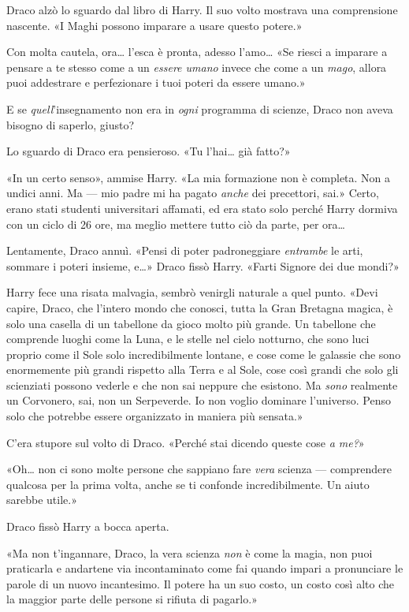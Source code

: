 Draco alzò lo sguardo dal libro di Harry. Il suo volto mostrava una comprensione nascente. «I Maghi possono imparare a usare questo potere.»

Con molta cautela, ora… l’esca è pronta, adesso l’amo… «Se riesci a imparare a pensare a te stesso come a un \textit{essere umano} invece che come a un \textit{mago}, allora puoi addestrare e perfezionare i tuoi poteri da essere umano.»

E se \textit{quell}’insegnamento non era in \textit{ogni} programma di scienze, Draco non aveva bisogno di saperlo, giusto?

Lo sguardo di Draco era pensieroso. «Tu l’hai… già fatto?»

«In un certo senso», ammise Harry. «La mia formazione non è completa. Non a undici anni. Ma — mio padre mi ha pagato \textit{anche} dei precettori, sai.» Certo, erano stati studenti universitari affamati, ed era stato solo perché Harry dormiva con un ciclo di 26 ore, ma meglio mettere tutto ciò da parte, per ora…

Lentamente, Draco annuì. «Pensi di poter padroneggiare \textit{entrambe} le arti, sommare i poteri insieme, e…» Draco fissò Harry. «Farti Signore dei due mondi?»

Harry fece una risata malvagia, sembrò venirgli naturale a quel punto. «Devi capire, Draco, che l’intero mondo che conosci, tutta la Gran Bretagna magica, è solo una casella di un tabellone da gioco molto più grande. Un tabellone che comprende luoghi come la Luna, e le stelle nel cielo notturno, che sono luci proprio come il Sole solo incredibilmente lontane, e cose come le galassie che sono enormemente più grandi rispetto alla Terra e al Sole, cose così grandi che solo gli scienziati possono vederle e che non sai neppure che esistono. Ma \textit{sono} realmente un Corvonero, sai, non un Serpeverde. Io non voglio dominare l’universo. Penso solo che potrebbe essere organizzato in maniera più sensata.»

C’era stupore sul volto di Draco. «Perché stai dicendo queste cose \textit{a me?}»

«Oh… non ci sono molte persone che sappiano fare \textit{vera} scienza — comprendere qualcosa per la prima volta, anche se ti confonde incredibilmente. Un aiuto sarebbe utile.»

Draco fissò Harry a bocca aperta.

«Ma non t’ingannare, Draco, la vera scienza \textit{non} è come la magia, non puoi praticarla e andartene via incontaminato come fai quando impari a pronunciare le parole di un nuovo incantesimo. Il potere ha un suo costo, un costo così alto che la maggior parte delle persone si rifiuta di pagarlo.»

